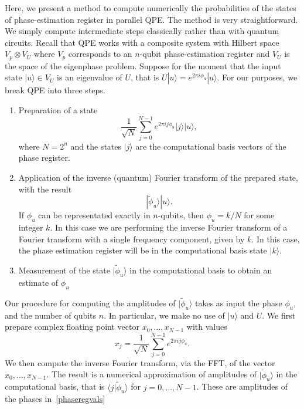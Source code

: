 \documentclass[superscriptaddress,nofootinbib,longbibliography,aps,pre]{revtex4-1}
\newcommand{\ket}[1]{|{#1}\rangle}
\newcommand{\braket}[2]{\langle{#1}|{#2}\rangle}
\begin{document}
Here, we present a method to compute numerically the probabilities
of the states of phase-estimation register in parallel QPE.
The method is very straightforward.
We simply compute intermediate steps classically rather than with quantum circuits.
Recall that QPE works with a composite system with Hilbert space $V_{p}\otimes V_{U}$
where $V_{p}$ corresponds to an $n$-qubit phase-estimation register and $V_{U}$ is
the space of the eigenphase problem.
Suppose for the moment that the input state $\ket{u}\in V_{U}$ is an eigenvalue of
$U$, that is $U\ket{u}=e^{2\pi i \phi_{u}}\ket{u}$.
For our purposes, we break QPE into three steps.
%
\begin{enumerate}
\item{Preparation of a state
    \begin{equation}
      \label{aftercontrolledU}
      \frac{1}{\sqrt{N}} \sum_{j=0}^{N-1} e^{2\pi i j \phi_{u}} \ket{j}\ket{u},
    \end{equation}
    where $N=2^{n}$ and the states $\ket{j}$ are the computational basis vectors of the phase register.
  }
\item{Application of the inverse (quantum) Fourier transform of the prepared state, with the result
    \begin{equation}
      \ket{\tilde{\phi}_{u}} \ket{u}.
    \end{equation}
    If $\phi_{u}$ can be representated exactly in $n$-qubits, then $\phi_{u}=k/N$ for some integer $k$.
    In this case we are performing the inverse Fourier transform of a Fourier transform with a single frequency
    component, given by $k$. In this case, the phase estimation register will be in the computational basis state $\ket{k}$.
    }
\item{Measurement of the state $\ket{\tilde{\phi}_{u}}$ in the computational basis to obtain an estimate of $\phi_{u}$}
\end{enumerate}
%
Our procedure for computing the amplitudes of $\ket{\tilde{\phi}_{u}}$
takes as input the phase $\phi_{u}$, and the number of qubits $n$.
In particular, we make no use of $\ket{u}$ and $U$.
We first prepare complex floating point vector $x_{0},\ldots, x_{N-1}$ with values
%
\begin{equation}
  x_{j} = \frac{1}{\sqrt{N}} \sum_{j=0}^{N-1} e^{2\pi i j \phi_{u}}.
\end{equation}
%
We then compute the inverse Fourier transform,
 via the FFT, of the vector $x_{0},\ldots, x_{N-1}$.
The result is a numerical approximation of amplitudes of $\ket{\tilde{\phi}_{u}}$
in the computational basis, that is $\braket{j}{\tilde\phi_{u}}$ for $j=0,\ldots, N-1$.
These are amplitudes of the phases in~\eqref{phaseregvals}
\end{document}
